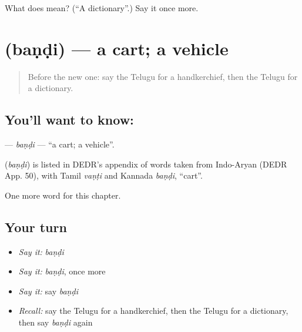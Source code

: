 \begin{tcolorbox}[breakable,colback=teal!4,colframe=teal!35!black,title={Before you move on}]
What does  mean? (\textquotedblleft{}A dictionary\textquotedblright{}.) Say it once more.
\end{tcolorbox}
\section[\texorpdfstring{\te{బండి} (baṇḍi)}{బండి (baṇḍi)}]{ (baṇḍi) — a cart; a vehicle}

\label{lesson:TE-C301-bandi}



\begin{quote}
Before the new one: say the Telugu for a handkerchief, then the Telugu for a dictionary.
\end{quote}

\subsection*{You'll want to know: }
\textbf{} — \emph{baṇḍi} — \textquotedblleft{}a cart; a vehicle\textquotedblright{}.

\begin{cousinweb}
\textbf{} (\emph{baṇḍi}) is listed in DEDR's appendix of words taken from Indo-Aryan (DEDR App. 50), with Tamil \emph{vaṇṭi} and Kannada \emph{baṇḍi}, \textquotedblleft{}cart\textquotedblright{}.
\end{cousinweb}

\begin{grammarlens}[title={What you've built}]
One more word for this chapter.
\end{grammarlens}

\subsection*{Your turn}
\begin{itemize}
\raggedright
  \item \emph{Say it:} \emph{baṇḍi}
  \item \emph{Say it:} \emph{baṇḍi}, once more
  \item \emph{Say it:} say \emph{baṇḍi}
  \item \emph{Recall:} say the Telugu for a handkerchief, then the Telugu for a dictionary, then say \emph{baṇḍi} again
\end{itemize}

